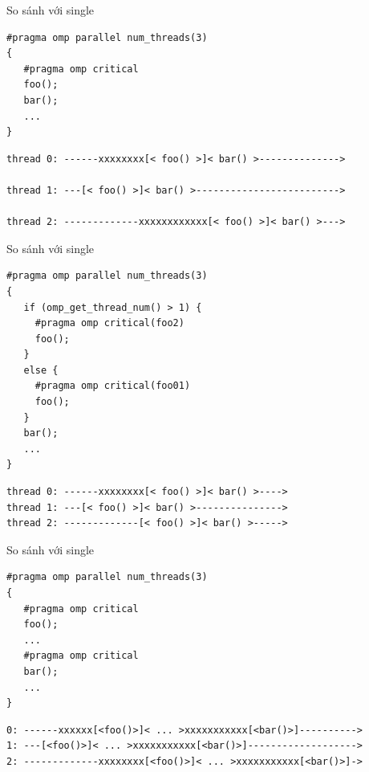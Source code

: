 \documentclass[10pt]{beamer}
\theoremstyle{remark}
\numberwithin{algocf}{section}
\numberwithin{equation}{section}
\numberwithin{dl}{section}
\numberwithin{figure}{section}
\begin{document}
\begin{frame}[fragile]{So sánh với single}
    \begin{verbatim}
#pragma omp parallel num_threads(3)
{
   #pragma omp critical
   foo();
   bar();
   ...
}
    \end{verbatim}
    \begin{verbatim}
thread 0: ------xxxxxxxx[< foo() >]< bar() >-------------->

thread 1: ---[< foo() >]< bar() >------------------------->

thread 2: -------------xxxxxxxxxxxx[< foo() >]< bar() >--->
    \end{verbatim}
\end{frame}

\begin{frame}[fragile]{So sánh với single}
    \begin{verbatim}
#pragma omp parallel num_threads(3)
{
   if (omp_get_thread_num() > 1) {
     #pragma omp critical(foo2)
     foo();
   }
   else {
     #pragma omp critical(foo01)
     foo();
   }
   bar();
   ...
}
    \end{verbatim}
    \begin{verbatim}
thread 0: ------xxxxxxxx[< foo() >]< bar() >---->
thread 1: ---[< foo() >]< bar() >--------------->
thread 2: -------------[< foo() >]< bar() >----->
    \end{verbatim}
\end{frame}

\begin{frame}[fragile]{So sánh với single}
    \begin{verbatim}
#pragma omp parallel num_threads(3)
{
   #pragma omp critical
   foo();
   ...
   #pragma omp critical
   bar();
   ...
}
    \end{verbatim}

    \begin{verbatim}
0: ------xxxxxx[<foo()>]< ... >xxxxxxxxxxx[<bar()>]---------->
1: ---[<foo()>]< ... >xxxxxxxxxxx[<bar()>]------------------->
2: -------------xxxxxxxx[<foo()>]< ... >xxxxxxxxxxx[<bar()>]->
    \end{verbatim}
\end{frame}
\end{document}
